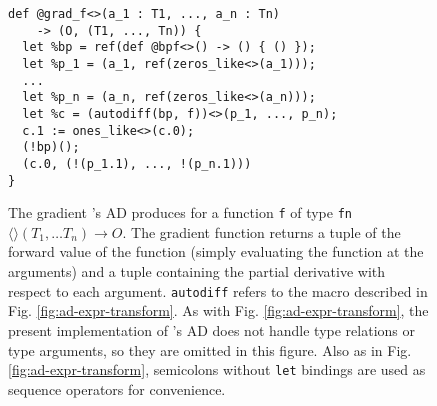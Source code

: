 \begin{figure}
  \begin{verbatim}
def @grad_f<>(a_1 : T1, ..., a_n : Tn)
    -> (O, (T1, ..., Tn)) {
  let %bp = ref(def @bpf<>() -> () { () });
  let %p_1 = (a_1, ref(zeros_like<>(a_1)));
  ...
  let %p_n = (a_n, ref(zeros_like<>(a_n)));
  let %c = (autodiff(bp, f))<>(p_1, ..., p_n);
  c.1 := ones_like<>(c.0);
  (!bp)();
  (c.0, (!(p_1.1), ..., !(p_n.1)))
}
  \end{verbatim}
  \caption{The gradient \relay{}'s AD produces
    for a function \texttt{f} of type
    \texttt{fn}$\langle\rangle(T_1, \ldots T_n) \rightarrow O$.
  The gradient function returns a tuple of
    the forward value of the function
    (simply evaluating the function at the arguments)
    and a tuple containing the
    partial derivative with respect to each argument.
  \texttt{autodiff} refers to the macro described in
    Fig. \ref{fig:ad-expr-transform}.
  As with Fig. \ref{fig:ad-expr-transform},
    the present implementation of
    \relay{}'s AD does not handle type relations or type arguments,
    so they are omitted in this figure.
  Also as in Fig. \ref{fig:ad-expr-transform},
    semicolons without \texttt{let} bindings
    are used as sequence operators for convenience.}
  \label{fig:ad-gradient}
\end{figure}
